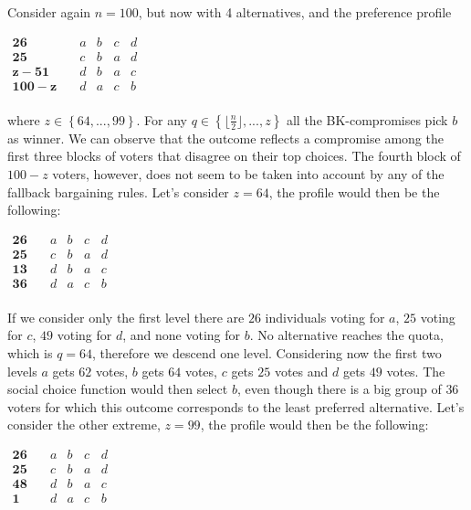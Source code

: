 \documentclass[version=3.21, pagesize, notitlepage, twoside=off, bibliography=totoc, DIV=calc, fontsize=12pt, a4paper]{scrartcl}
\begin{document}
\begin{example}
	\label{ex:exk}
	Consider again $n=100$, but now with 4 alternatives, and the preference profile
	\begin{center}
		$
		\begin{array}{ccccc}
		\mathbf{26} \quad &a&b&c&d\\
		\mathbf{25} \quad &c&b&a&d\\
		\mathbf{z-51} \quad &d&b&a&c\\
		\mathbf{100-z} \quad &d&a&c&b\\
		\end{array}
		$
	\end{center}
where $z\in \left\{ 64,..., 99\right\}$. For any $q\in \left\{ \lfloor \frac{n}{2}\rfloor,..., z\right\}$ all the BK-compromises pick $b$ as winner. We can observe that the outcome reflects a compromise among the first three blocks of voters that disagree on their top choices. The fourth block of $100-z$ voters, however, does not seem to be taken into account by any of the fallback bargaining rules. 
Let's consider $z=64$, the profile would then be the following: 

\begin{center}
	$
	\begin{array}{ccccc}
	\mathbf{26} \quad &a&b&c&d\\
	\mathbf{25} \quad &c&b&a&d\\
	\mathbf{13} \quad &d&b&a&c\\
	\mathbf{36} \quad &d&a&c&b\\
	\end{array}
	$
\end{center}

If we consider only the first level there are $26$ individuals voting for $a$, $25$ voting for $c$, $49$ voting for $d$, and none voting for $b$. No alternative reaches the quota, which is $q=64$, therefore we descend one level. Considering now the first two levels $a$ gets $62$ votes, $b$ gets $64$ votes, $c$ gets $25$ votes and $d$ gets $49$ votes. The social choice function would then select $b$, even though there is a big group of $36$ voters for which this outcome corresponds to the least preferred alternative.
Let's consider the other extreme, $z=99$, the profile would then be the following: 

\begin{center}
	$
	\begin{array}{ccccc}
	\mathbf{26} \quad &a&b&c&d\\
	\mathbf{25} \quad &c&b&a&d\\
	\mathbf{48} \quad &d&b&a&c\\
	\mathbf{1} \quad &d&a&c&b\\
	\end{array}
	$
\end{center} 


\end{example}
\end{document}
